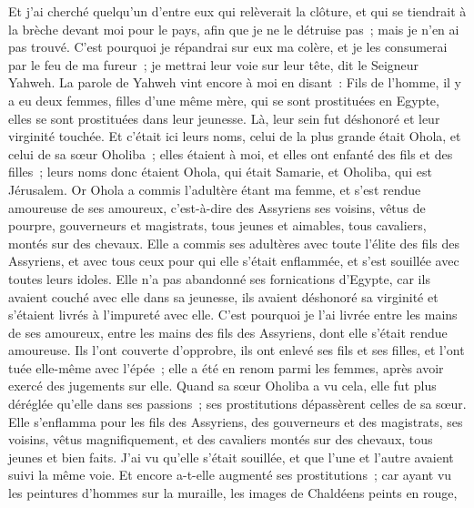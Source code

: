 \begin{multicols}{2}
Et j'ai cherché quelqu'un d'entre eux qui relèverait la clôture, et qui se tiendrait à la brèche devant moi pour le pays, afin que je ne le détruise pas~; mais je n'en ai pas trouvé. 
C'est pourquoi je répandrai sur eux ma colère, et je les consumerai par le feu de ma fureur~; je mettrai leur voie sur leur tête, dit le Seigneur Yahweh.
\VerseOne{}La parole de Yahweh vint encore à moi en disant~:
Fils de l'homme, il y a eu deux femmes, filles d'une même mère,
qui se sont prostituées en Egypte, elles se sont prostituées dans leur jeunesse. Là, leur sein fut déshonoré et leur virginité touchée.
Et c'était ici leurs noms, celui de la plus grande était Ohola, et celui de sa sœur Oholiba~; elles étaient à moi, et elles ont enfanté des fils et des filles~; leurs noms donc étaient Ohola, qui était Samarie, et Oholiba, qui est Jérusalem.
Or Ohola a commis l'adultère étant ma femme, et s'est rendue amoureuse de ses amoureux, c'est-à-dire des Assyriens ses voisins,
vêtus de pourpre, gouverneurs et magistrats, tous jeunes et aimables, tous cavaliers, montés sur des chevaux.
Elle a commis ses adultères avec toute l'élite des fils des Assyriens, et avec tous ceux pour qui elle s'était enflammée, et s'est souillée avec toutes leurs idoles.
Elle n'a pas abandonné ses fornications d'Egypte, car ils avaient couché avec elle dans sa jeunesse, ils avaient déshonoré sa virginité et s'étaient livrés à l'impureté avec elle.
C'est pourquoi je l'ai livrée entre les mains de ses amoureux, entre les mains des fils des Assyriens, dont elle s'était rendue amoureuse.
Ils l'ont couverte d'opprobre, ils ont enlevé ses fils et ses filles, et l'ont tuée elle-même avec l'épée~; elle a été en renom parmi les femmes, après avoir exercé des jugements sur elle.
Quand sa sœur Oholiba a vu cela, elle fut plus déréglée qu'elle dans ses passions~; ses prostitutions dépassèrent celles de sa sœur.
Elle s'enflamma pour les fils des Assyriens, des gouverneurs et des magistrats, ses voisins, vêtus magnifiquement, et des cavaliers montés sur des chevaux, tous jeunes et bien faits.
J'ai vu qu'elle s'était souillée, et que l'une et l'autre avaient suivi la même voie.
Et encore a-t-elle augmenté ses prostitutions~; car ayant vu les peintures d'hommes sur la muraille, les images de Chaldéens peints en rouge,

\end{multicols}

